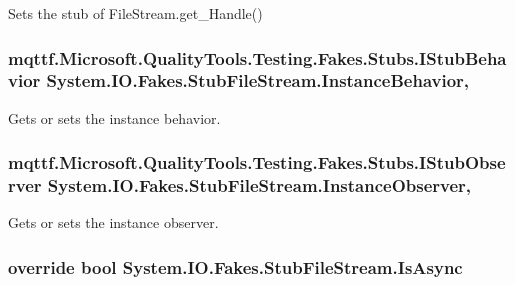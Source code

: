 Sets the stub of File\-Stream.\-get\-\_\-\-Handle()

\hypertarget{class_system_1_1_i_o_1_1_fakes_1_1_stub_file_stream_aa6711c24971e56dd573df81d5e31c9d3}{
\subsubsection[{Instance\-Behavior}]{\setlength{\rightskip}{0pt plus 5cm}mqttf.\-Microsoft.\-Quality\-Tools.\-Testing.\-Fakes.\-Stubs.\-I\-Stub\-Behavior System.\-I\-O.\-Fakes.\-Stub\-File\-Stream.\-Instance\-Behavior\hspace{0.3cm}{\ttfamily [get]}, {\ttfamily [set]}}}\label{class_system_1_1_i_o_1_1_fakes_1_1_stub_file_stream_aa6711c24971e56dd573df81d5e31c9d3}


Gets or sets the instance behavior.

\hypertarget{class_system_1_1_i_o_1_1_fakes_1_1_stub_file_stream_a337b7889533dc811555b388caf4ec8cf}{
\subsubsection[{Instance\-Observer}]{\setlength{\rightskip}{0pt plus 5cm}mqttf.\-Microsoft.\-Quality\-Tools.\-Testing.\-Fakes.\-Stubs.\-I\-Stub\-Observer System.\-I\-O.\-Fakes.\-Stub\-File\-Stream.\-Instance\-Observer\hspace{0.3cm}{\ttfamily [get]}, {\ttfamily [set]}}}\label{class_system_1_1_i_o_1_1_fakes_1_1_stub_file_stream_a337b7889533dc811555b388caf4ec8cf}


Gets or sets the instance observer.

\hypertarget{class_system_1_1_i_o_1_1_fakes_1_1_stub_file_stream_a1f5ce59cd69a8c391d69526ca69a04c8}{
\subsubsection[{Is\-Async}]{\setlength{\rightskip}{0pt plus 5cm}override bool System.\-I\-O.\-Fakes.\-Stub\-File\-Stream.\-Is\-Async\hspace{0.3cm}{\ttfamily [get]}}}\label{class_system_1_1_i_o_1_1_fakes_1_1_stub_file_stream_a1f5ce59cd69a8c391d69526ca69a04c8}



